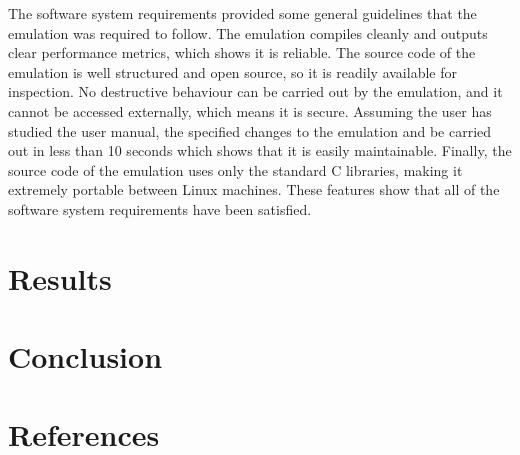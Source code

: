 \documentclass[a4paper, 12pt]{article}
\begin{document}
The software system requirements provided some general guidelines that the emulation was required to follow. The emulation compiles cleanly and outputs clear performance metrics, which shows it is reliable. The source code of the emulation is well structured and open source, so it is readily available for inspection. No destructive behaviour can be carried out by the emulation, and it cannot be accessed externally, which means it is secure. Assuming the user has studied the user manual, the specified changes to the emulation and be carried out in less than 10 seconds which shows that it is easily maintainable. Finally, the source code of the emulation uses only the standard C libraries, making it extremely portable between Linux machines. These features show that all of the software system requirements have been satisfied.

\newpage
\section{Results}



\newpage
\section{Conclusion}



\newpage
\section{References}
\end{document}
